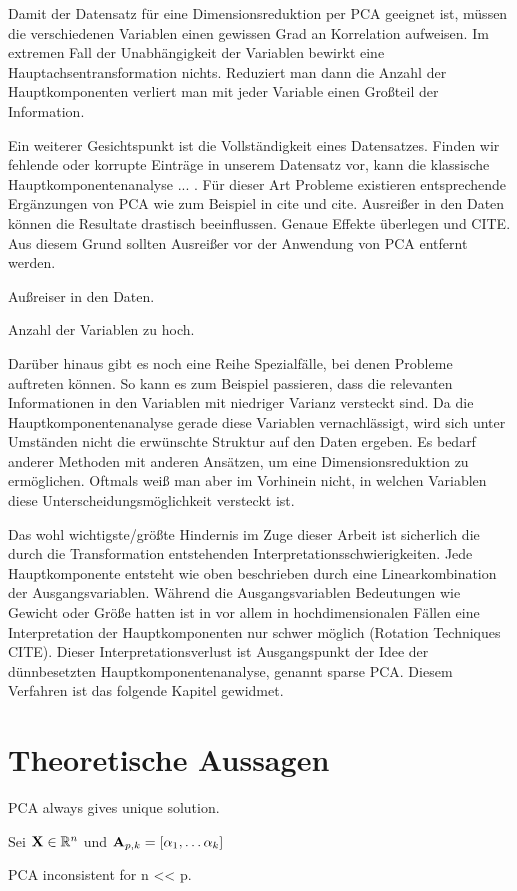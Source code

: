 Damit der Datensatz für eine Dimensionsreduktion per PCA geeignet ist, müssen die verschiedenen Variablen einen gewissen Grad an Korrelation aufweisen. Im extremen Fall der Unabhängigkeit der Variablen bewirkt eine Hauptachsentransformation nichts. Reduziert man dann die Anzahl der Hauptkomponenten verliert man mit jeder Variable einen Großteil der Information.

Ein weiterer Gesichtspunkt ist die Vollständigkeit eines Datensatzes. Finden wir fehlende oder korrupte Einträge in unserem Datensatz vor, kann die klassische Hauptkomponentenanalyse ... . Für dieser Art Probleme existieren entsprechende Ergänzungen von PCA wie zum Beispiel in cite und cite. Ausreißer in den Daten können die Resultate drastisch beeinflussen. Genaue Effekte überlegen und CITE. Aus diesem Grund sollten Ausreißer vor der Anwendung von PCA entfernt werden.

Außreiser in den Daten.

Anzahl der Variablen zu hoch.

Darüber hinaus gibt es noch eine Reihe Spezialfälle, bei denen Probleme auftreten können. So kann es zum Beispiel passieren, dass die relevanten Informationen in den Variablen mit niedriger Varianz versteckt sind. Da die Hauptkomponentenanalyse gerade diese Variablen vernachlässigt, wird sich unter Umständen nicht die erwünschte Struktur auf den Daten ergeben. Es bedarf anderer Methoden mit anderen Ansätzen, um eine Dimensionsreduktion zu ermöglichen. Oftmals weiß man aber im Vorhinein nicht, in welchen Variablen diese Unterscheidungsmöglichkeit versteckt ist.

Das wohl wichtigste/größte Hindernis im Zuge dieser Arbeit ist sicherlich die durch die Transformation entstehenden Interpretationsschwierigkeiten. Jede Hauptkomponente entsteht wie oben beschrieben durch eine Linearkombination der Ausgangsvariablen. Während die Ausgangsvariablen Bedeutungen wie Gewicht oder Größe hatten ist in vor allem in hochdimensionalen Fällen eine Interpretation der Hauptkomponenten nur schwer möglich (Rotation Techniques CITE). Dieser Interpretationsverlust ist Ausgangspunkt der Idee der dünnbesetzten Hauptkomponentenanalyse, genannt sparse PCA. Diesem Verfahren ist das folgende Kapitel gewidmet.


\section{Theoretische Aussagen}

\begin{thm}
PCA always gives unique solution.
\end{thm}

\begin{thm}
Sei $\mathbf{X} \in \mathbb{R}^n$ und $\mathbf{A}_{p,k} = [\alpha_1, \ldots \alpha_k] $   
\end{thm}

\begin{thm}
PCA inconsistent for n << p.
\end{thm}

